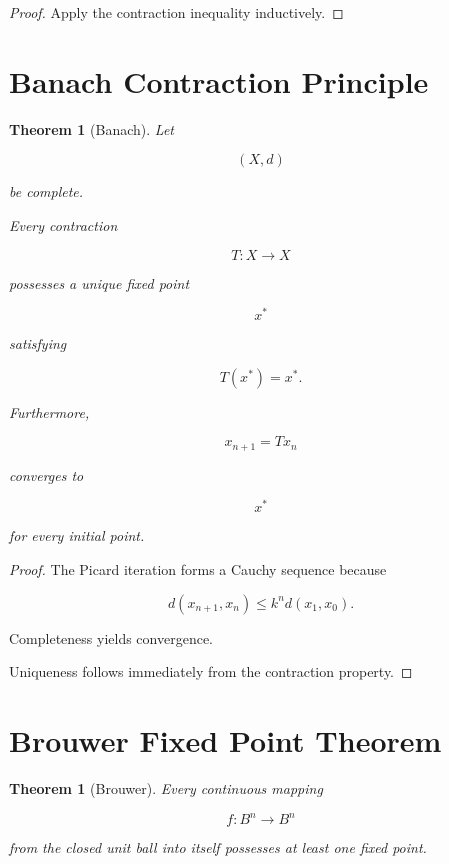 \documentclass[11pt]{book}
\numberwithin{equation}{chapter}
\theoremstyle{definition}
\theoremstyle{plain}
\newtheorem{theorem}[definition]{Theorem}
\begin{document}
\begin{proof}

Apply the contraction inequality inductively.

\end{proof}


\section{Banach Contraction Principle}

\begin{theorem}[Banach]

Let

\[
(X,d)
\]

be complete.

Every contraction

\[
T:X\rightarrow X
\]

possesses a unique fixed point

\[
x^*
\]

satisfying

\[
T(x^*)=x^*.
\]

Furthermore,

\[
x_{n+1}=Tx_n
\]

converges to

\[
x^*
\]

for every initial point.

\end{theorem}

\begin{proof}

The Picard iteration forms a Cauchy sequence because

\[
d(x_{n+1},x_n)
\le
k^n
d(x_1,x_0).
\]

Completeness yields convergence.

Uniqueness follows immediately from the contraction property.

\end{proof}


\section{Brouwer Fixed Point Theorem}

\begin{theorem}[Brouwer]

Every continuous mapping

\[
f:B^n\rightarrow B^n
\]

from the closed unit ball into itself possesses at least one fixed
point.

\end{theorem}
\end{document}
